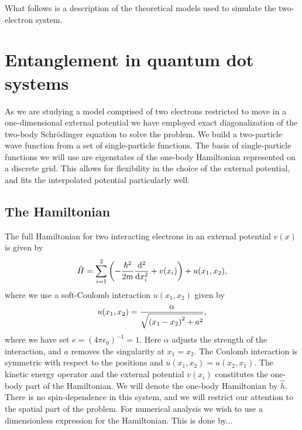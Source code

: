 \documentclass[twocolumn,superscriptaddress,unsortedaddress,
 amsmath,amssymb,
 aps,
]{revtex4-2}
\begin{document}
What follows is a description of the theoretical models used to
simulate the two-electron system. 

\section{Entanglement in quantum dot systems} %
    As we are studying a model comprised of two electrons restricted to move in a
    one-dimensional external potential we have employed exact diagonalization of the
    two-body Schrödinger equation to solve the problem.
    We build a two-particle wave function from a set of single-particle
    functions.
    The basis of single-particle functions we will use are eigenstates of the
    one-body Hamiltonian represented on a discrete grid.
    This allows for flexibility in the choice of the external potential, and fits the
    interpolated potential particularly well.

    \subsection{The Hamiltonian}
        The full Hamiltonian for two interacting electrons in an external
        potential $v(x)$ is given by
        \begin{align*}
            \hat{H}
            = \sum_{i = 1}^{2}\qty(
                -\frac{\hbar^2}{2m}\dv[2]{}{x_i}
                + v(x_i)
            )
            + u(x_1, x_2),
        \end{align*}
        where we use a soft-Coulomb interaction $u(x_1, x_2)$ given by
        \begin{align}
            u(x_1, x_2)
            =
            \frac{\alpha}{\sqrt{\qty(x_1 - x_2)^2 + a^2}},
            \label{eq:soft-coulomb}
        \end{align}
        where we have set $e = (4 \pi \epsilon_0)^{-1} = 1$.
        Here $\alpha$ adjusts the strength of the interaction, and $a$ removes
        the singularity at $x_1 = x_2$.
        The Coulomb interaction is symmetric with respect to the positions and
        $u(x_1, x_2) = u(x_2, x_1)$.
        The kinetic energy operator and the external potential $v(x_i)$ constitutes
        the one-body part of the Hamiltonian.
        We will denote the one-body Hamiltonian by $\hat{h}$.
        There is no spin-dependence in this system, and we will restrict our attention
        to the spatial part of the problem.
        For numerical analysis we wish to use a dimensionless expression for the
        Hamiltonian.
        This is done by...
\end{document}
